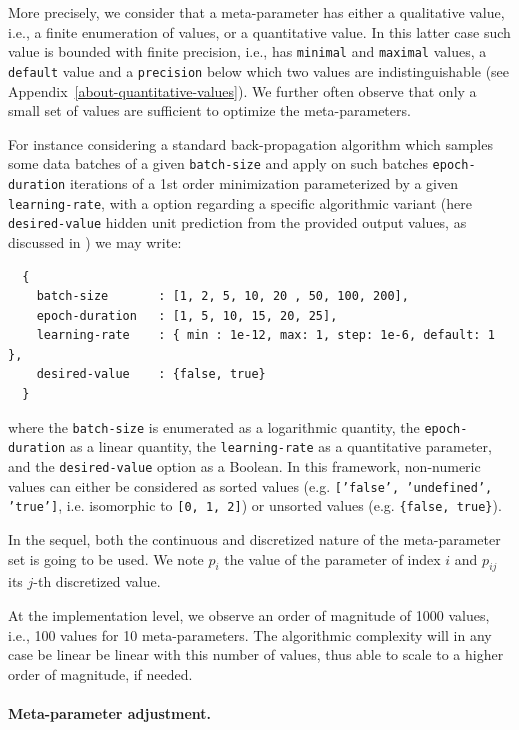 \documentclass{article}
\begin{document}
More precisely, we consider that a meta-parameter has either a qualitative value, i.e., a finite enumeration of values, or a quantitative value. In this latter case such value is bounded with finite precision, i.e., has {\tt minimal} and {\tt maximal} values, a {\tt default} value and a {\tt precision} below which two values are indistinguishable (see Appendix~\ref{about-quantitative-values}). We further often observe \cite{} that only a small set of values are sufficient to optimize the meta-parameters. 

For instance considering a standard back-propagation algorithm which samples some data batches of a given {\tt batch-size} and apply on such batches {\tt epoch-duration} iterations of a 1st order minimization parameterized by a given {\tt learning-rate}, with a option regarding a specific algorithmic variant (here {\tt desired-value} hidden unit prediction from the provided output values, as discussed in \cite{vieville:hal-01610735}) we may write:{\small \begin{verbatim}
  {
    batch-size       : [1, 2, 5, 10, 20 , 50, 100, 200],
    epoch-duration   : [1, 5, 10, 15, 20, 25],
    learning-rate    : { min : 1e-12, max: 1, step: 1e-6, default: 1 },
    desired-value    : {false, true}
  }
\end{verbatim}}
\noindent where the {\tt batch-size} is enumerated as a logarithmic quantity, the {\tt epoch-duration} as a linear quantity, the {\tt learning-rate} as a quantitative parameter, and the {\tt desired-value} option as a Boolean. In this framework, non-numeric values can either be considered as sorted values (e.g. {\tt ['false', 'undefined', 'true']}, i.e. isomorphic to {\tt [0, 1, 2]}) or unsorted values (e.g. {\tt \{false, true\}}).

In the sequel, both the continuous and discretized nature of the meta-parameter set is going to be used. We note $p_i$ the value of the parameter of index $i$ and $p_{ij}$ its $j$-th discretized value.

At the implementation level, we observe \cite{} an order of magnitude of 1000 values, i.e., 100 values for 10 meta-parameters. The algorithmic complexity will in any case be linear be linear with this number of values, thus able to scale to a higher order of magnitude, if needed.

\paragraph{Meta-parameter adjustment.}
\end{document}
